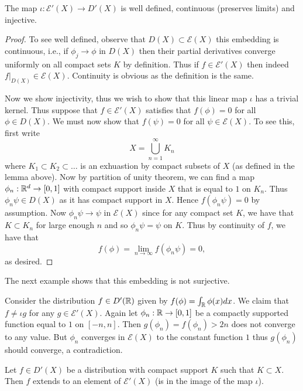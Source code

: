 \documentclass[twoside, a4paper, 10pt]{amsart}
\begin{document}
\begin{lemma}\label{lemma: E' embeds in D'} The map $\iota:\mathcal{E}'(X) \to D'(X)$ is well defined, continuous (preserves limits) and injective.

\end{lemma}

\begin{proof} To see well defined, observe that $D(X) \subset \mathcal{E}(X)$ this embedding is continuous, i.e., if $\phi_j \to \phi$ in $D(X)$ then their partial derivatives converge uniformly on all compact sets $K$ by definition. Thus if $f \in \mathcal{E}'(X)$ then indeed $f|_{D(X)} \in \mathcal{E}(X)$. Continuity is obvious as the definition is the same. 

Now we show injectivity, thus we wish to show that this linear map $\iota$ has a trivial kernel. Thus suppose that $f \in \mathcal{E}'(X)$ satisfies that $f(\phi) = 0$ for all $\phi \in D(X)$. We must now show that $f(\psi) = 0$ for all $\psi \in \mathcal{E}(X)$. To see this, first write $$X = \bigcup_{n=1}^{\infty} K_n$$ where $K_1 \subset K_2 \subset \ldots$ is an exhuastion by compact subsets of $X$ (as defined in the lemma above). Now by partition of unity theorem, we can find a map $\phi_n:\mathbb{R}^d \to [0,1]$ with compact support inside $X$ that is equal to $1$ on $K_n$.  Thus $\phi_n \psi \in D(X)$ as it has compact support in $X$. Hence $f(\phi_n \psi) = 0$ by assumption. Now $\phi_n\psi \to \psi$ in $\mathcal{E}(X)$ since for any compact set $K$, we have that $K \subset K_n$ for large enough $n$ and so $\phi_n\psi = \psi$ on $K$. Thus by continuity of $f$, we have that $$f(\phi) = \lim_{n \to \infty} f(\phi_n \psi) = 0,$$ as desired. \end{proof}

The next example shows that this embedding is not surjective.

\begin{eg} Consider the distribution $f \in D'(\mathbb{R})$ given by $f(\phi) = \int_{\mathbb{R}} \phi(x) dx $. We claim that $f \neq \iota g$ for any $g \in \mathcal{E}'(X)$. Again let $\phi_n:\mathbb{R} \to [0,1]$ be a compactly supported function equal to $1$ on $[-n,n]$. Then $g(\phi_n) = f(\phi_n) > 2n$ does not converge to any value. But $\phi_n$ converges in $\mathcal{E}(X)$ to the constant function $1$ thus $g(\phi_n)$ should converge, a contradiction. 

\end{eg}

\begin{lemma} Let $f \in D'(X)$ be a distribution with compact support $K$ such that $K \subset X$. Then $f$ extends to an element of $\mathcal{E}'(X)$ (is in the image of the map $\iota$).

\end{lemma}
\end{document}
